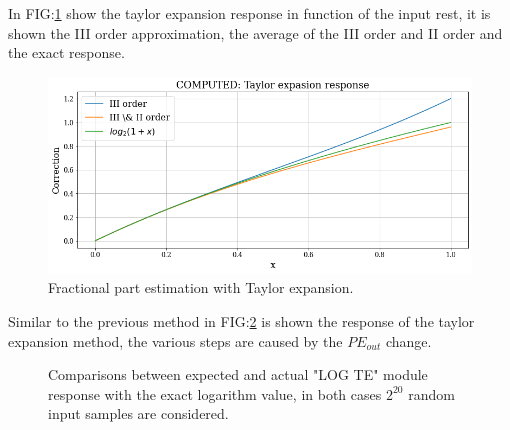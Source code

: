 \documentclass[12pt]{article}
\begin{document}
In FIG:\ref{fig:TE_resp} show the taylor expansion response in function of the input rest, it is shown the III order approximation, the average of the III order and II order and the exact response.
\begin{figure}[h]
    \includegraphics[width=1.0\textwidth]{Images/TE_respnse.png}
    \caption{Fractional part estimation with Taylor expansion.}
    \label{fig:TE_resp}
\end{figure}

Similar to the previous method in FIG:\ref{fig:TE_LOG} is shown the response of the taylor expansion method, the various steps are caused by the $PE_{out}$ change.
\begin{figure}[h]
    \begin{minipage}[c]{0.5\linewidth}
        \vspace{0pt}
        \centering
    \end{minipage}%
    \hfill%
    \begin{minipage}[c]{0.5\linewidth}
        \vspace{0pt}
        \centering
    \end{minipage}%
    \caption{Comparisons between expected and actual "LOG TE" module response with the exact logarithm value, in both cases $2^{20}$ random input samples are considered.}
    \label{fig:TE_LOG}
\end{figure}
\end{document}
